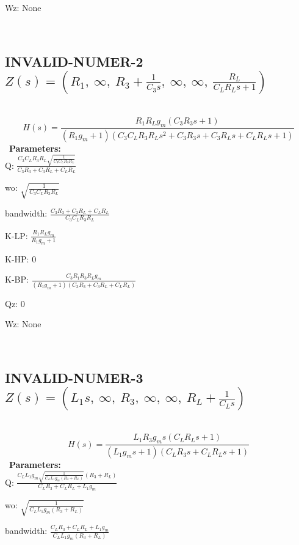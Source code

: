 \documentclass{article}
\begin{document}
Wz: $\text{None}$\ 

\ 

\subsection{INVALID-NUMER-2 $Z(s) = \left( R_{1}, \  \infty, \  R_{3} + \frac{1}{C_{3} s}, \  \infty, \  \infty, \  \frac{R_{L}}{C_{L} R_{L} s + 1}\right)$ } \ 
\textbf{\[H(s) = \frac{R_{1} R_{L} g_{m} \left(C_{3} R_{3} s + 1\right)}{\left(R_{1} g_{m} + 1\right) \left(C_{3} C_{L} R_{3} R_{L} s^{2} + C_{3} R_{3} s + C_{3} R_{L} s + C_{L} R_{L} s + 1\right)}\] } \ 
\textbf{Parameters:}\\ 

Q: $\frac{C_{3} C_{L} R_{3} R_{L} \sqrt{\frac{1}{C_{3} C_{L} R_{3} R_{L}}}}{C_{3} R_{3} + C_{3} R_{L} + C_{L} R_{L}}$\ 

wo: $\sqrt{\frac{1}{C_{3} C_{L} R_{3} R_{L}}}$\ 

bandwidth: $\frac{C_{3} R_{3} + C_{3} R_{L} + C_{L} R_{L}}{C_{3} C_{L} R_{3} R_{L}}$\ 

K-LP: $\frac{R_{1} R_{L} g_{m}}{R_{1} g_{m} + 1}$\ 

K-HP: $0$\ 

K-BP: $\frac{C_{3} R_{1} R_{3} R_{L} g_{m}}{\left(R_{1} g_{m} + 1\right) \left(C_{3} R_{3} + C_{3} R_{L} + C_{L} R_{L}\right)}$\ 

Qz: $0$\ 

Wz: $\text{None}$\ 

\ 

\subsection{INVALID-NUMER-3 $Z(s) = \left( L_{1} s, \  \infty, \  R_{3}, \  \infty, \  \infty, \  R_{L} + \frac{1}{C_{L} s}\right)$ } \ 
\textbf{\[H(s) = \frac{L_{1} R_{3} g_{m} s \left(C_{L} R_{L} s + 1\right)}{\left(L_{1} g_{m} s + 1\right) \left(C_{L} R_{3} s + C_{L} R_{L} s + 1\right)}\] } \ 
\textbf{Parameters:}\\ 

Q: $\frac{C_{L} L_{1} g_{m} \sqrt{\frac{1}{C_{L} L_{1} g_{m} \left(R_{3} + R_{L}\right)}} \left(R_{3} + R_{L}\right)}{C_{L} R_{3} + C_{L} R_{L} + L_{1} g_{m}}$\ 

wo: $\sqrt{\frac{1}{C_{L} L_{1} g_{m} \left(R_{3} + R_{L}\right)}}$\ 

bandwidth: $\frac{C_{L} R_{3} + C_{L} R_{L} + L_{1} g_{m}}{C_{L} L_{1} g_{m} \left(R_{3} + R_{L}\right)}$\ 
\end{document}
